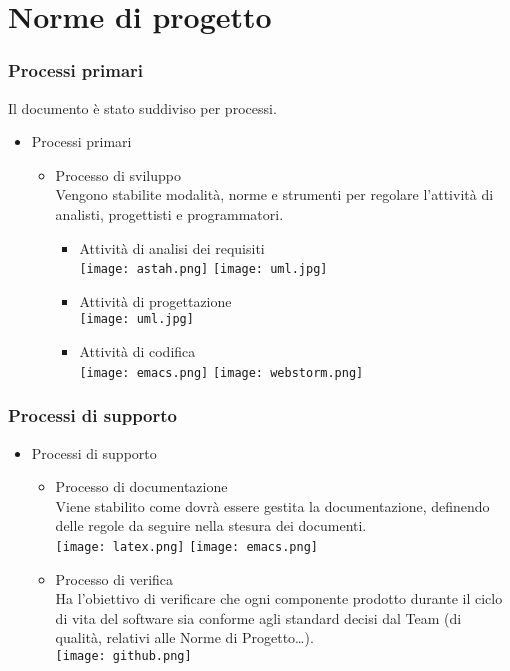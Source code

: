 \section{Norme di progetto}
\begin{frame}
  \frametitle{Processi primari}
  Il documento è stato suddiviso per processi.
  \begin{itemize}
  \item Processi primari
    \begin{itemize}
    \item Processo di sviluppo\\
      Vengono stabilite modalità, norme e strumenti per regolare l'attività di analisti, progettisti e programmatori.
      \begin{itemize}
      \item Attività di analisi dei requisiti\\
        \texttt{[image: astah.png]}
        \texttt{[image: uml.jpg]}
      \item Attività di progettazione\\
        \texttt{[image: uml.jpg]}
      \item Attività di codifica\\
        \texttt{[image: emacs.png]}
        \texttt{[image: webstorm.png]}
      \end{itemize}
    \end{itemize}
  \end{itemize}
\end{frame}

\begin{frame}
  \frametitle{Processi di supporto}
  \begin{itemize}
  \item Processi di supporto
    \begin{itemize}
    \item Processo di documentazione\\
      Viene stabilito come dovrà essere gestita la documentazione, definendo delle regole da seguire nella stesura dei documenti.\\
      \texttt{[image: latex.png]}
      \texttt{[image: emacs.png]}
    \item Processo di verifica\\ Ha l'obiettivo di verificare che ogni componente prodotto durante il ciclo di vita del software sia conforme agli standard decisi dal Team (di qualità, relativi alle Norme di Progetto\dots).\\
      \texttt{[image: github.png]}
    \end{itemize}
  \end{itemize}
\end{frame}

